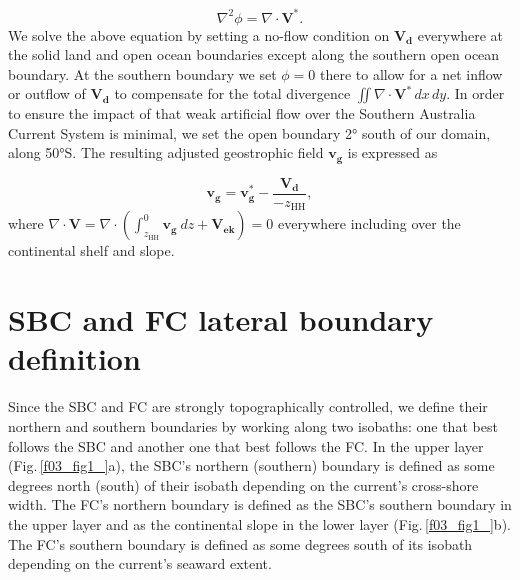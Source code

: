 \documentclass[preprint,3p,review,12pt]{elsarticle}
\renewcommand{\Vec}[1]{\mathbf{#1}}
\newcommand{\sub}[1]{_{\text{#1}}}
\begin{document}
\begin{equation}
\nabla^{2}\phi = \nabla\cdot\Vec{V}^{*}.
\end{equation}
%
We solve the above equation by setting a no-flow condition on $\Vec{V\sub{d}}$ everywhere at the solid land and open ocean boundaries except along the southern open ocean boundary. At the southern boundary we set $\phi=0$ there to allow for a net inflow or outflow of $\Vec{V\sub{d}}$ to compensate for the total divergence $\iint\nabla\cdot\Vec{V}^{*}\,dx\,dy$. In order to ensure the impact of that weak artificial flow over the Southern Australia Current System is minimal, we set the open boundary \ang{2} south of our domain, along \ang{50}S. The resulting adjusted geostrophic field $\Vec{v\sub{g}}$ is expressed as

\begin{equation}
\Vec{v\sub{g}} = \Vec{v\sub{g}^{*}} - \frac{\Vec{V\sub{d}}}{-z\sub{HH}},
\end{equation}
%
where $\nabla\cdot\Vec{V}=\nabla\cdot(\int_{z\sub{HH}}^{0}\Vec{v\sub{g}}\ dz + \Vec{V\sub{ek}})=0$ everywhere including over the continental shelf and slope.

\section{SBC and FC lateral boundary definition} \label{SBC and FC lateral boundary definition}
Since the SBC and FC are strongly topographically controlled, we define their northern and southern boundaries by working along two isobaths: one that best follows the SBC and another one that best follows the FC\@. In the upper layer (Fig.\,\ref{f03_fig1_}a), the SBC's northern (southern) boundary is defined as some degrees north (south) of their isobath depending on the current's cross-shore width. The FC's northern boundary is defined as the SBC's southern boundary in the upper layer and as the continental slope in the lower layer (Fig.\,\ref{f03_fig1_}b). The FC's southern boundary is defined as some degrees south of its isobath depending on the current's seaward extent. 
\end{document}
